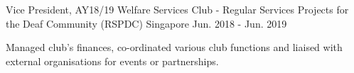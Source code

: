 

\begin{cventries}

  \cventry
    {Vice President, AY18/19} %
    {Welfare Services Club - Regular Services Projects for the Deaf Community (RSPDC)} %
    {Singapore} %
    {Jun. 2018 - Jun. 2019} %
    {
      \begin{cvitems} %
        \item {Managed club’s finances, co-ordinated various club functions and liaised with external organisations for events or partnerships.}
      \end{cvitems}
    }

\end{cventries}
